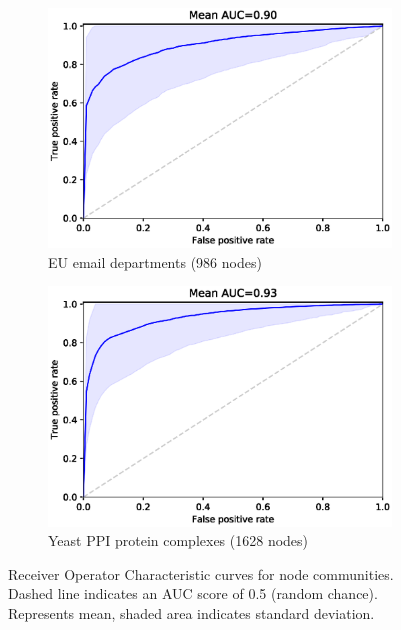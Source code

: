 \documentclass[manuscript, proceedings]{acmart}
\begin{document}
\begin{figure}
    \centering
    \begin{subfigure}[b]{0.48\textwidth}
        \centering
        \includegraphics[width=\textwidth]{images/eu_email_nodewise_roc.eps}
        \caption{EU email departments (986 nodes)}
    \end{subfigure}
    \begin{subfigure}[b]{0.48\textwidth}
        \centering
        \includegraphics[width=\textwidth]{images/yeast_ppi_nodewise_roc.eps}
        \caption{Yeast PPI protein complexes (1628 nodes)}
    \end{subfigure}
    \caption{Receiver Operator Characteristic curves for node communities.
    Dashed line indicates an AUC score of 0.5 (random chance).
    Represents mean, shaded area indicates standard deviation.
    }
    \label{fig:real_network_nodwise_classifiers}
\end{figure}
\end{document}
